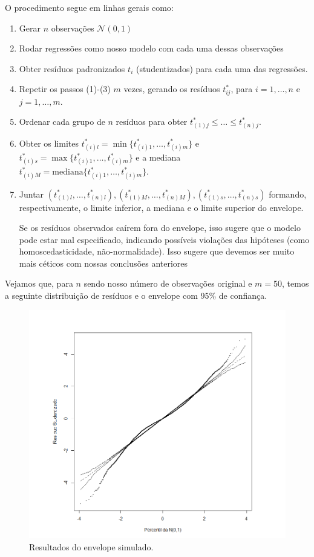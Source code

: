 \documentclass[paper=a4wide, fontsize=10pt]{scrartcl}	 %
\begin{document}
    O procedimento segue em linhas gerais como:
    \begin{enumerate}
    \item Gerar \( n \) observações \( \mathcal{N}(0, 1) \)
    \item Rodar regressões como nosso modelo com cada uma dessas observações
    \item Obter resíduos padronizados \(t_i\) (studentizados) para cada uma das regressões.
    \item Repetir os passos (1)-(3) \( m \) vezes, gerando os resíduos \( t_{ij}^* \), para \( i = 1, \ldots, n \) e \( j = 1, \ldots, m \).
    \item Ordenar cada grupo de \( n \) resíduos para obter \( t_{(1)j}^* \leq \ldots \leq t_{(n)j}^* \).
    \item Obter os limites \( t_{(i)l}^* = \min\{t_{(i)1}^*, \ldots, t_{(i)m}^*\} \) e \( t_{(i)s}^* = \max\{t_{(i)1}^*, \ldots, t_{(i)m}^*\} \) e a mediana \( t_{(i)M}^* = \text{mediana}\{t_{(i)1}^*, \ldots, t_{(i)m}^*\} \). 
    \item Juntar \( (t_{(1)l}^*, \ldots, t_{(n)l}^*), (t_{(1)M}^*, \ldots, t_{(n)M}^*), (t_{(1)s}^*, \ldots, t_{(n)s}^*) \) formando, respectivamente, o limite inferior, a mediana e o limite superior do envelope.

    Se os resíduos observados caírem fora do envelope, isso sugere que o modelo pode estar mal especificado, indicando possíveis violações das hipóteses (como homoscedasticidade, não-normalidade). Isso sugere que devemos ser muito mais céticos com nossas conclusões anteriores

\end{enumerate}

Vejamos que, para \(n\) sendo nosso número de observações original e \(m=50\), temos a seguinte distribuição de resíduos e o envelope com 95\% de confiança.

\begin{figure}[H]
\centering
\includegraphics[width=0.8\linewidth]{Rplot01.png}
\caption{Resultados do envelope simulado.}
\end{figure}
\end{document}

